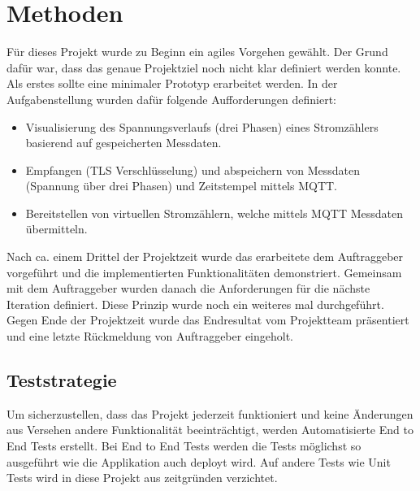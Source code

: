 \chapter{Methoden}
\label{methoden}
Für dieses Projekt wurde zu Beginn ein agiles Vorgehen gewählt.
Der Grund dafür war, dass das genaue Projektziel noch nicht klar definiert werden konnte.
Als erstes sollte eine minimaler Prototyp erarbeitet werden. In der Aufgabenstellung \cite{aufgabenstellung} wurden dafür folgende Aufforderungen definiert:
\begin{itemize}
\item Visualisierung des Spannungsverlaufs (drei Phasen) eines Stromzählers
basierend auf gespeicherten Messdaten.
\item Empfangen (TLS Verschlüsselung) und abspeichern von Messdaten (Spannung über drei Phasen) und
Zeitstempel mittels MQTT.
\item Bereitstellen von virtuellen Stromzählern, welche mittels MQTT Messdaten
übermitteln.
\end{itemize}
Nach ca. einem Drittel der Projektzeit wurde das erarbeitete dem Auftraggeber vorgeführt und die implementierten Funktionalitäten demonstriert.
Gemeinsam mit dem Auftraggeber wurden danach die Anforderungen für die nächste Iteration definiert.
Diese Prinzip wurde noch ein weiteres mal durchgeführt.
Gegen Ende der Projektzeit wurde das Endresultat vom Projektteam präsentiert und eine letzte Rückmeldung von Auftraggeber eingeholt.




\section{Teststrategie}
\label{teststrategie}

Um sicherzustellen, dass das Projekt jederzeit funktioniert und keine Änderungen
aus Versehen andere Funktionalität beeinträchtigt, werden Automatisierte
End to End Tests erstellt. Bei End to End Tests werden die Tests möglichst
so ausgeführt wie die Applikation auch deployt wird. \parencite{georgian_2021}
Auf andere Tests wie Unit Tests wird in diese Projekt aus zeitgründen verzichtet.

